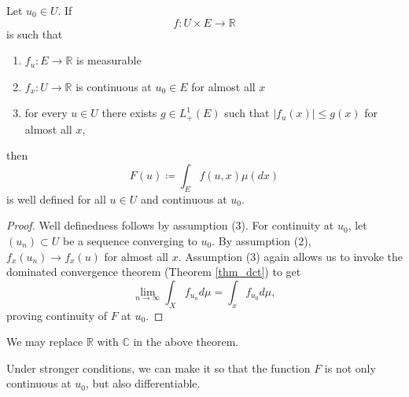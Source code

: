 \documentclass[12pt]{article}
\begin{document}
\begin{theorem}
\label{thm_integral_depending_on_parameter}
	Let $u_0\in U$. If 
	\begin{equation*}
		f:U\times E \to \mathbb{R}
	\end{equation*}
	is such that
	\begin{enumerate}
		\item $f_u:E\to \mathbb{R}$ is measurable
		\item $f_x:U\to \mathbb{R}$ is continuous at $u_0\in E$ for almost all $x$
		\item for every $u\in U$ there exists $g\in L^1_+(E)$ such that $|f_u(x)|\leq g(x)$ for almost all $x$,
	\end{enumerate}
	then  
	\begin{equation*}
		F(u) \coloneqq \int_E f(u,x) \mu(dx)
	\end{equation*}
	is well defined for all $u\in U$ and continuous at $u_0$.
\end{theorem}
\begin{proof}
	Well definedness follows by assumption (3). For continuity at $u_0$, let $(u_n)\subset U$ be a sequence converging to $u_0$. By assumption (2), $f_x(u_n) \to f_x(u)$ for almost all $x$. Assumption (3) again allows us to invoke the dominated convergence theorem (Theorem \ref{thm_dct}) to get 
	\begin{equation*}
		\lim_{n\to\infty} \int_X f_{u_n} d\mu = \int_x f_{u_0} d\mu,
	\end{equation*}
	proving continuity of $F$ at $u_0$.
\end{proof}

\begin{remark}
	We may replace $\mathbb{R}$ with $\mathbb{C}$ in the above theorem.
\end{remark}

Under stronger conditions, we can make it so that the function $F$ is not only continuous at $u_0$, but also differentiable.
\end{document}
